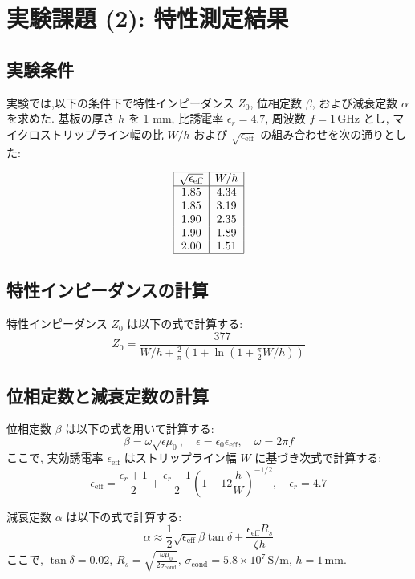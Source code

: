 \documentclass[a4paper, twocolumn]{article} %
\begin{document}
\section{実験課題 (2): 特性測定結果}

\subsection{実験条件}
実験では,以下の条件下で特性インピーダンス \( Z_0 \), 位相定数 \(\beta\), および減衰定数 \(\alpha\) を求めた.
基板の厚さ \( h \) を 1 mm, 比誘電率 \( \epsilon_r = 4.7 \), 周波数 \( f = 1 \, \text{GHz} \) とし, マイクロストリップライン幅の比 \( W/h \) および \(\sqrt{\epsilon_{\text{eff}}}\) の組み合わせを次の通りとした:

\[
\begin{array}{|c|c|}
\hline
\sqrt{\epsilon_{\text{eff}}} & W/h \\
\hline
1.85 & 4.34 \\
1.85 & 3.19 \\
1.90 & 2.35 \\
1.90 & 1.89 \\
2.00 & 1.51 \\
\hline
\end{array}
\]

\subsection{特性インピーダンスの計算}
特性インピーダンス \( Z_0 \) は以下の式で計算する:
\[
Z_0 = \frac{377}{W/h + \frac{2}{\pi} \left( 1 + \ln\left(1 + \frac{\pi}{2} W/h\right)\right)}
\]

\subsection{位相定数と減衰定数の計算}

位相定数 \(\beta\) は以下の式を用いて計算する:
\[
\beta = \omega \sqrt{\epsilon \mu_0}, \quad \epsilon = \epsilon_0 \epsilon_{\text{eff}}, \quad \omega = 2 \pi f
\]
ここで, 実効誘電率 \( \epsilon_{\text{eff}} \) はストリップライン幅 \( W \) に基づき次式で計算する:
\[
\epsilon_{\text{eff}} = \frac{\epsilon_r + 1}{2} + \frac{\epsilon_r - 1}{2} \left(1 + 12 \frac{h}{W}\right)^{-1/2}, \quad \epsilon_r = 4.7
\]

減衰定数 \(\alpha\) は以下の式で計算する:
\[
\alpha \approx \frac{1}{2} \sqrt{\epsilon_{\text{eff}}} \beta \tan \delta + \frac{\epsilon_{\text{eff}} R_s}{\zeta h}
\]
ここで, \( \tan \delta = 0.02 \), \( R_s = \sqrt{\frac{\omega \mu_0}{2 \sigma_{\text{cond}}}}, \, \sigma_{\text{cond}} = 5.8 \times 10^7 \, \text{S/m} \), \( h = 1 \, \text{mm} \).
\end{document}
